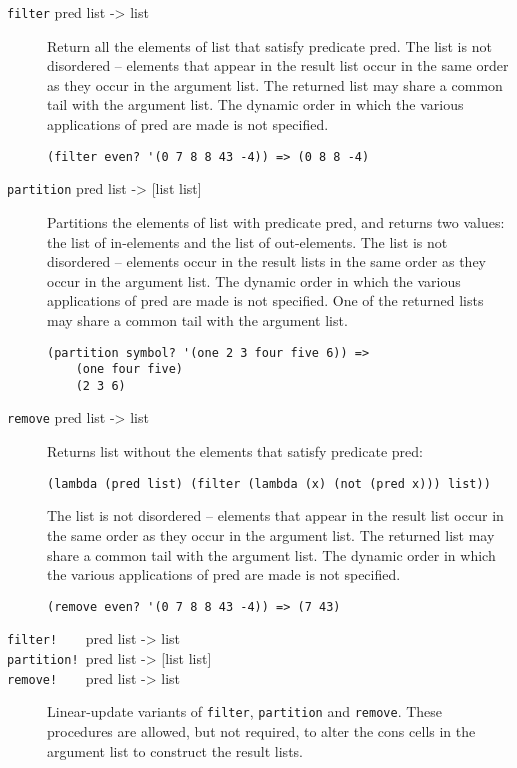 \begin{description}
\item[ \href{}{} \texttt{filter} pred list -\textgreater{} list ]
Return all the elements of list that satisfy predicate pred. The list is
not disordered -- elements that appear in the result list occur in the
same order as they occur in the argument list. The returned list may
share a common tail with the argument list. The dynamic order in which
the various applications of pred are made is not specified.

\begin{verbatim}
(filter even? '(0 7 8 8 43 -4)) => (0 8 8 -4)
\end{verbatim}
\item[ \href{}{} \texttt{partition} pred list -\textgreater{} {[}list
list{]} ]
Partitions the elements of list with predicate pred, and returns two
values: the list of in-elements and the list of out-elements. The list
is not disordered -- elements occur in the result lists in the same
order as they occur in the argument list. The dynamic order in which the
various applications of pred are made is not specified. One of the
returned lists may share a common tail with the argument list.

\begin{verbatim}
(partition symbol? '(one 2 3 four five 6)) => 
    (one four five)
    (2 3 6)
\end{verbatim}
\item[ \href{}{} \texttt{remove} pred list -\textgreater{} list ]
Returns list without the elements that satisfy predicate pred:

\begin{verbatim}
(lambda (pred list) (filter (lambda (x) (not (pred x))) list))
\end{verbatim}

The list is not disordered -- elements that appear in the result list
occur in the same order as they occur in the argument list. The returned
list may share a common tail with the argument list. The dynamic order
in which the various applications of pred are made is not specified.

\begin{verbatim}
(remove even? '(0 7 8 8 43 -4)) => (7 43)
\end{verbatim}
\item[ \href{}{} \texttt{filter!~~~~}pred list -\textgreater{} list\\
\href{}{} \texttt{partition!~}pred list -\textgreater{} {[}list
list{]}\\
\href{}{} \texttt{remove!~~~~}pred list -\textgreater{} list ]
Linear-update variants of \texttt{filter}, \texttt{partition} and
\texttt{remove}. These procedures are allowed, but not required, to
alter the cons cells in the argument list to construct the result lists.
\end{description}

